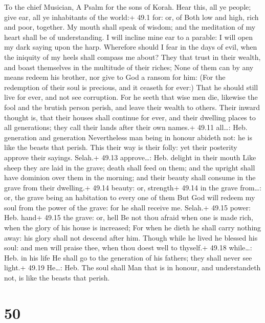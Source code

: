 To the chief Musician, A Psalm for the sons of Korah.  Hear
this, all ye people; give ear, all ye inhabitants of the world:+ 49.1
for: or, of  Both low and high, rich and poor, together.
 My mouth shall speak of wisdom; and the meditation of my
heart shall be of understanding.  I will incline mine ear to
a parable: I will open my dark saying upon the harp. 
Wherefore should I fear in the days of evil, when the iniquity of my
heels shall compass me about?  They that trust in their
wealth, and boast themselves in the multitude of their riches;
 None of them can by any means redeem his brother, nor give
to God a ransom for him:  (For the redemption of their soul
is precious, and it ceaseth for ever:)  That he should still
live for ever, and not see corruption.  For he seeth that
wise men die, likewise the fool and the brutish person perish, and leave
their wealth to others.  Their inward thought is, that
their houses shall continue for ever, and their dwelling places to all
generations; they call their lands after their own names.+ 49.11
all\ldots: Heb. generation and generation  Nevertheless man
being in honour abideth not: he is like the beasts that perish.
 This their way is their folly: yet their posterity approve
their sayings. Selah.+ 49.13 approve\ldots: Heb. delight in their mouth
 Like sheep they are laid in the grave; death shall feed on
them; and the upright shall have dominion over them in the morning; and
their beauty shall consume in the grave from their dwelling.+ 49.14
beauty: or, strength+ 49.14 in the grave from\ldots: or, the grave being
an habitation to every one of them  But God will redeem my
soul from the power of the grave: for he shall receive me. Selah.+ 49.15
power: Heb. hand+ 49.15 the grave: or, hell  Be not thou
afraid when one is made rich, when the glory of his house is increased;
 For when he dieth he shall carry nothing away: his glory
shall not descend after him.  Though while he lived he
blessed his soul: and men will praise thee, when thou doest well to
thyself.+ 49.18 while\ldots: Heb. in his life  He shall go
to the generation of his fathers; they shall never see light.+ 49.19
He\ldots: Heb. The soul shall  Man that is in honour, and
understandeth not, is like the beasts that perish.

\hypertarget{section-49}{%
\section{50}\label{section-49}}

